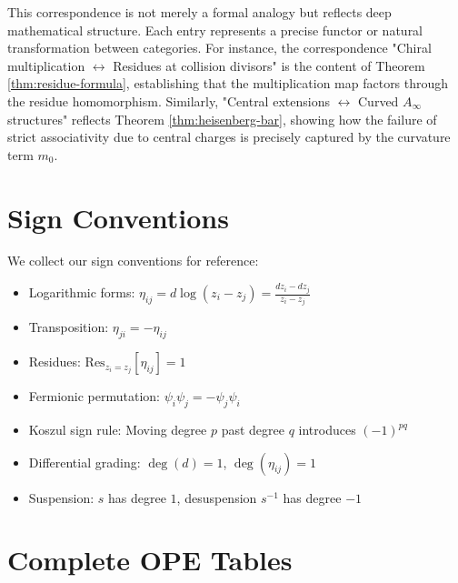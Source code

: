 \begin{remark}
This correspondence is not merely a formal analogy but reflects deep mathematical structure. Each entry represents a precise functor or natural transformation between categories. For instance, the correspondence "Chiral multiplication $\leftrightarrow$ Residues at collision divisors" is the content of Theorem \ref{thm:residue-formula}, establishing that the multiplication map factors through the residue homomorphism. Similarly, "Central extensions $\leftrightarrow$ Curved $A_\infty$ structures" reflects Theorem \ref{thm:heisenberg-bar}, showing how the failure of strict associativity due to central charges is precisely captured by the curvature term $m_0$.
\end{remark}


 
\chapter{Sign Conventions}
 
We collect our sign conventions for reference:
\begin{itemize}
\item Logarithmic forms: $\eta_{ij} = d\log(z_i - z_j) = \frac{dz_i - dz_j}{z_i - z_j}$
\item Transposition: $\eta_{ji} = -\eta_{ij}$
\item Residues: $\text{Res}_{z_i=z_j}[\eta_{ij}] = 1$
\item Fermionic permutation: $\psi_i\psi_j = -\psi_j\psi_i$
\item Koszul sign rule: Moving degree $p$ past degree $q$ introduces $(-1)^{pq}$
\item Differential grading: $\deg(d) = 1$, $\deg(\eta_{ij}) = 1$
\item Suspension: $s$ has degree $1$, desuspension $s^{-1}$ has degree $-1$
\end{itemize}
 
\chapter{Complete OPE Tables}
 
